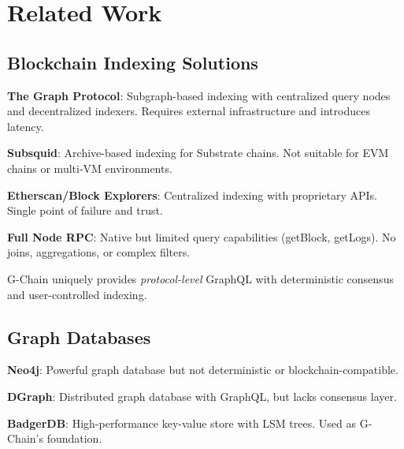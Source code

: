 \section{Related Work}


\subsection{Blockchain Indexing Solutions}

\textbf{The Graph Protocol}: Subgraph-based indexing with centralized query nodes and decentralized indexers. Requires external infrastructure and introduces latency.

\textbf{Subsquid}: Archive-based indexing for Substrate chains. Not suitable for EVM chains or multi-VM environments.

\textbf{Etherscan/Block Explorers}: Centralized indexing with proprietary APIs. Single point of failure and trust.

\textbf{Full Node RPC}: Native but limited query capabilities (getBlock, getLogs). No joins, aggregations, or complex filters.

G-Chain uniquely provides \textit{protocol-level} GraphQL with deterministic consensus and user-controlled indexing.

\subsection{Graph Databases}

\textbf{Neo4j}: Powerful graph database but not deterministic or blockchain-compatible.

\textbf{DGraph}: Distributed graph database with GraphQL, but lacks consensus layer.

\textbf{BadgerDB}: High-performance key-value store with LSM trees. Used as G-Chain's foundation.

